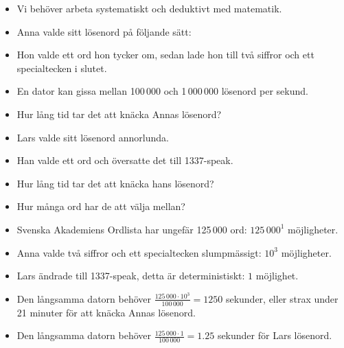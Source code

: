 \begin{frame}
  \begin{solution}
    \begin{itemize}
      \item Vi behöver arbeta systematiskt och deduktivt med matematik.
    \end{itemize}
  \end{solution}
\end{frame}

\begin{frame}
  \begin{exercise}
    \begin{itemize}
      \item Anna valde sitt lösenord på följande sätt:
      \item Hon valde ett ord hon tycker om, sedan lade hon till två siffror 
        och ett specialtecken i slutet.
      \item En dator kan gissa mellan 100\,000 och 1\,000\,000 lösenord per 
        sekund.
      \item Hur lång tid tar det att knäcka Annas lösenord?
    \end{itemize}
  \end{exercise}

  \pause

  \begin{exercise}
    \begin{itemize}
      \item Lars valde sitt lösenord annorlunda.
      \item Han valde ett ord och översatte det till 1337-speak.
      \item Hur lång tid tar det att knäcka hans lösenord?
    \end{itemize}
  \end{exercise}
\end{frame}

\begin{frame}
  \begin{solution}
    \begin{itemize}
      \item<+-> Hur många ord har de att välja mellan?
      \item<+-> Svenska Akademiens Ordlista har ungefär 125\,000 ord: 
        \(125\,000^1\) möjligheter.
      \item<+-> Anna valde två siffror och ett specialtecken slumpmässigt: 
        \(10^3\) möjligheter.
      \item<+-> Lars ändrade till 1337-speak, detta är deterministiskt: \(1\) 
        möjlighet.
      \item<+-> Den \alert{långsamma} datorn behöver \(\frac{125\,000\cdot 
        10^3}{100\,000} = 1250\) sekunder, eller strax under 21 minuter för att 
        knäcka Annas lösenord.
      \item<+-> Den \alert{långsamma} datorn behöver \(\frac{125\,000\cdot 
        1}{100\,000} = 
        1.25\) sekunder för Lars lösenord.
    \end{itemize}
  \end{solution}
\end{frame}

